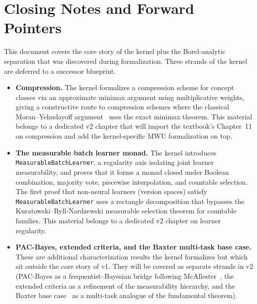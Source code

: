 
\chapter{Closing Notes and Forward Pointers}\label{chap:closing}

This document covers the core story of the kernel plus the
Borel-analytic separation that was discovered during formalization.
Three strands of the kernel are deferred to a successor blueprint.

\begin{itemize}[leftmargin=*,itemsep=4pt]
  \item \textbf{Compression.} The kernel formalizes a compression
    scheme for concept classes via an approximate minimax argument
    using multiplicative weights, giving a constructive route to
    compression schemes where the classical Moran--Yehudayoff
    argument~\cite{MoranYehudayoff2016} uses the exact minimax
    theorem. This material belongs to a dedicated v2 chapter that
    will import the textbook's Chapter~11 on compression and add the
    kernel-specific MWU formalization on top.

  \item \textbf{The measurable batch learner monad.} The kernel
    introduces \texttt{MeasurableBatchLearner}, a regularity axis
    isolating joint learner measurability, and proves that it forms a
    monad closed under Boolean combination, majority vote, piecewise
    interpolation, and countable selection. The first proof that
    non-neural learners (version spaces) satisfy
    \texttt{MeasurableBatchLearner} uses a rectangle decomposition
    that bypasses the Kuratowski--Ryll-Nardzewski measurable
    selection theorem for countable families. This material belongs
    to a dedicated v2 chapter on learner regularity.

  \item \textbf{PAC-Bayes, extended criteria, and the Baxter
    multi-task base case.} These are additional characterization
    results the kernel formalizes but which sit outside the core
    story of v1. They will be covered as separate strands in v2
    (PAC-Bayes as a frequentist--Bayesian bridge following
    McAllester~\cite{McAllester1999}, the extended criteria as a
    refinement of the measurability hierarchy, and the Baxter base
    case~\cite{Baxter2000} as a multi-task analogue of the
    fundamental theorem).
\end{itemize}

